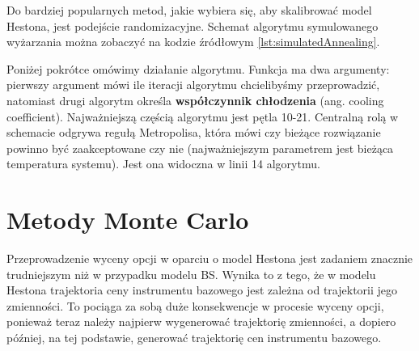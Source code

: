 \documentclass{pracamgr}
\begin{document}
Do bardziej popularnych metod, jakie wybiera się, aby skalibrować model Hestona, jest podejście randomizacyjne. Schemat algorytmu symulowanego wyżarzania można zobaczyć na kodzie źródłowym
\ref{lst:simulatedAnnealing}.

Poniżej pokrótce omówimy działanie algorytmu.
Funkcja ma dwa argumenty: pierwszy argument mówi ile iteracji algorytmu chcielibyśmy przeprowadzić, natomiast
drugi algorytm określa \textbf{współczynnik chłodzenia} (ang. cooling coefficient).
Najważniejszą częścią algorytmu jest pętla 10-21. 
Centralną rolą w schemacie odgrywa regułą Metropolisa, która mówi czy bieżące rozwiązanie powinno być 
zaakceptowane czy nie (najważniejszym parametrem jest bieżąca temperatura systemu). Jest ona widoczna w linii 14 algorytmu. 








\chapter{Metody Monte Carlo}
\label{chap:monteCarlo}

Przeprowadzenie wyceny opcji w oparciu o model Hestona jest zadaniem znacznie trudniejszym
niż w przypadku modelu BS. Wynika to z tego, że w modelu Hestona trajektoria 
ceny instrumentu bazowego jest zależna od trajektorii jego zmienności. To pociąga za sobą 
duże konsekwencje w procesie wyceny opcji, ponieważ teraz należy najpierw wygenerować trajektorię zmienności, a dopiero później, na tej podstawie, generować trajektorię cen instrumentu bazowego.
\end{document}
